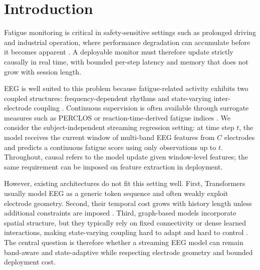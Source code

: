 \documentclass[preprint,12pt]{elsarticle}
\begin{document}
\section{Introduction}
\label{sec:intro}

Fatigue monitoring is critical in safety-sensitive settings such as prolonged driving and industrial operation, where performance degradation can accumulate before it becomes apparent \cite{Williamson2011FatigueSafety,Sikander2019DriverFatigueReview}. 
A deployable monitor must therefore update strictly causally in real time, with bounded per-step latency and memory that does not grow with session length.

EEG is well suited to this problem because fatigue-related activity exhibits two coupled structures: frequency-dependent rhythms and state-varying inter-electrode coupling \cite{Lal2001DriverFatigue,Eoh2005DrowsinessEEG}. 
Continuous supervision is often available through surrogate measures such as PERCLOS or reaction-time-derived fatigue indices \cite{Dinges1998PERCLOS,Zheng2017CriticalBands,cao2019multi,Li2026MPDDF}. 
We consider the subject-independent streaming regression setting: at time step $t$, the model receives the current window of multi-band EEG features from $C$ electrodes and predicts a continuous fatigue score using only observations up to $t$. 
Throughout, causal refers to the model update given window-level features; the same requirement can be imposed on feature extraction in deployment.

However, existing architectures do not fit this setting well. 
First, Transformers usually model EEG as a generic token sequence and often weakly exploit electrode geometry. 
Second, their temporal cost grows with history length unless additional constraints are imposed \cite{vaswani2017attention,Beltagy2020Longformer}. 
Third, graph-based models incorporate spatial structure, but they typically rely on fixed connectivity or dense learned interactions, making state-varying coupling hard to adapt and hard to control \cite{kipf2016semi,velivckovic2017graph}. 
The central question is therefore whether a streaming EEG model can remain band-aware and state-adaptive while respecting electrode geometry and bounded deployment cost.
\end{document}
